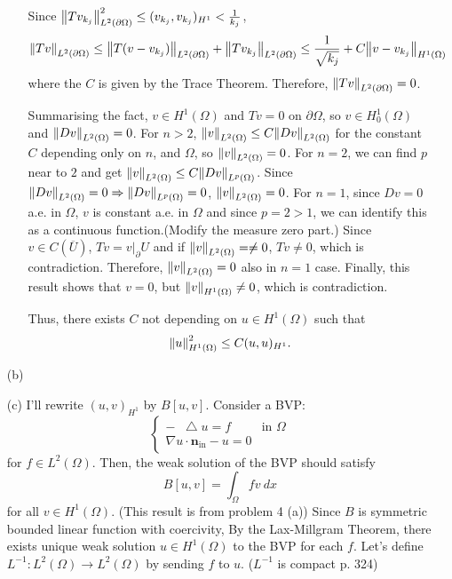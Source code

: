 \documentclass{article}
\newcommand*\Laplace{\mathop{}\!\mathbin\bigtriangleup}
\begin{document}
\begin{enumerate}
\begin{enumerate}
Since $\norm{Tv_{k_j}}^2_{L^2(\partial \Omega)}\leq (v_{k_j},v_{k_j})_{H^1}<\frac{1}{k_j}$,
\begin{equation*}
\norm{Tv}_{L^2(\partial \Omega)}\leq \norm{T(v-v_{k_j})}_{L^2(\partial \Omega)}+\norm{Tv_{k_j}}_{L^2(\partial \Omega)}\leq \frac{1}{\sqrt{k_j}}+C\norm{v-v_{k_j}}_{H^1(\Omega)}
\end{equation*}
where the $C$ is given by the Trace Theorem. Therefore, $\norm{Tv}_{L^2(\partial \Omega)}=0$.

Summarising the fact, $v\in H^1(\Omega)$ and $Tv=0$ on $\partial \Omega$, so $v\in H^1_0(\Omega)$ and $\norm{Dv}_{L^2(\Omega)}=0$. For $n>2$, $\norm{v}_{L^2(\Omega)}\leq C\norm{Dv}_{L^2(\Omega)}$ for the constant $C$ depending only on $n$, and $\Omega$, so $\norm{v}_{L^2(\Omega)}=0$. For $n=2$, we can find $p$ near to $2$ and get $\norm{v}_{L^2(\Omega)}\leq C\norm{Dv}_{L^p(\Omega)}$. Since $\norm{Dv}_{L^2(\Omega)}=0\Rightarrow \norm{Dv}_{L^p(\Omega)}=0$, $\norm{v}_{L^2(\Omega)}=0$. For $n=1$, since $Dv=0$ a.e. in $\Omega$, $v$ is constant a.e. in $\Omega$ and since $p=2>1$, we can identify this as a continuous function.(Modify the measure zero part.) Since $v\in C(\overline{U})$, $Tv=v|_\partial{U}$ and if $\norm{v}_{L^2(\Omega)}=\neq 0$, $Tv\neq 0$, which is contradiction. Therefore, $\norm{v}_{L^2(\Omega)}=0$ also in $n=1$ case. Finally, this result shows that $v=0$, but $\norm{v}_{H^1(\Omega)}\neq 0$, which is contradiction.

Thus, there exists $C$ not depending on $u\in H^1(\Omega)$ such that
\begin{equation*}
\norm{u}^2_{H^1(\Omega)}\leq C(u,u)_{H^1}.
\end{equation*}
\end{enumerate}
\item[(b)]
\item[(c)] I'll rewrite $(u,v)_{H^1}$ by $B[u,v]$. Consider a BVP:
\begin{equation*}
\begin{cases}
-\Laplace u=f & \text{in }\Omega\\
\nabla u\cdot \bm{n}_{\text{in}}-u=0
\end{cases}
\end{equation*}
for $f\in L^2(\Omega)$. Then, the weak solution of the BVP should satisfy
\begin{equation*}
B[u,v]=\int_\Omega f v~dx
\end{equation*}
for all $v\in H^1(\Omega)$. (This result is from problem 4 (a)) Since $B$ is symmetric bounded linear function with coercivity, By the Lax-Millgram Theorem, there exists unique weak solution $u\in H^1(\Omega)$ to the BVP for each $f$. Let's define $L^{-1}:L^2(\Omega)\rightarrow L^2(\Omega)$ by sending $f$ to $u$. ($L^{-1}$ is compact p. 324)


\end{enumerate}
\end{document}
